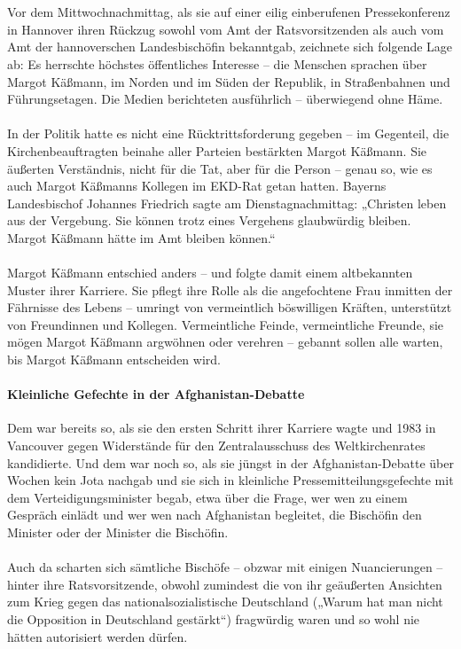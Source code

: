 \documentclass[a4paper,12pt,twoside]{scrbook}
\begin{document}
\\\\
Vor dem Mittwochnachmittag, als sie auf einer eilig einberufenen Pressekonferenz in Hannover ihren Rückzug sowohl vom Amt der Ratsvorsitzenden als auch vom Amt der hannoverschen Landesbischöfin bekanntgab, zeichnete sich folgende Lage ab: Es herrschte höchstes öffentliches Interesse – die Menschen sprachen über Margot Käßmann, im Norden und im Süden der Republik, in Straßenbahnen und Führungsetagen. Die Medien berichteten ausführlich – überwiegend ohne Häme.
\\\\
In der Politik hatte es nicht eine Rücktrittsforderung gegeben – im Gegenteil, die Kirchenbeauftragten beinahe aller Parteien bestärkten Margot Käßmann. Sie äußerten Verständnis, nicht für die Tat, aber für die Person – genau so, wie es auch Margot Käßmanns Kollegen im EKD-Rat getan hatten. Bayerns Landesbischof Johannes Friedrich sagte am Dienstagnachmittag: „Christen leben aus der Vergebung. Sie können trotz eines Vergehens glaubwürdig bleiben. Margot Käßmann hätte im Amt bleiben können.“
\\\\
Margot Käßmann entschied anders – und folgte damit einem altbekannten Muster ihrer Karriere. Sie pflegt ihre Rolle als die angefochtene Frau inmitten der Fährnisse des Lebens – umringt von vermeintlich böswilligen Kräften, unterstützt von Freundinnen und Kollegen. Vermeintliche Feinde, vermeintliche Freunde, sie mögen Margot Käßmann argwöhnen oder verehren – gebannt sollen alle warten, bis Margot Käßmann entscheiden wird.
\paragraph{Kleinliche Gefechte in der Afghanistan-Debatte}
Dem war bereits so, als sie den ersten Schritt ihrer Karriere wagte und 1983 in Vancouver gegen Widerstände für den Zentralausschuss des Weltkirchenrates kandidierte. Und dem war noch so, als sie jüngst in der Afghanistan-Debatte über Wochen kein Jota nachgab und sie sich in kleinliche Pressemitteilungsgefechte mit dem Verteidigungsminister begab, etwa über die Frage, wer wen zu einem Gespräch einlädt und wer wen nach Afghanistan begleitet, die Bischöfin den Minister oder der Minister die Bischöfin.
\\\\
Auch da scharten sich sämtliche Bischöfe – obzwar mit einigen Nuancierungen – hinter ihre Ratsvorsitzende, obwohl zumindest die von ihr geäußerten Ansichten zum Krieg gegen das nationalsozialistische Deutschland („Warum hat man nicht die Opposition in Deutschland gestärkt“) fragwürdig waren und so wohl nie hätten autorisiert werden dürfen.
\end{document}
